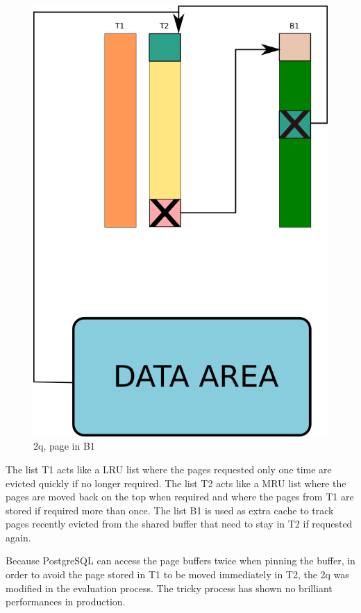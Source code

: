 \begin{figure}[H]
\includegraphics[scale=0.4]{images/2q_04.png}

\caption{2q, page in B1}

\end{figure}

The list T1 acts like a LRU list where the pages requested only one time are evicted quickly if no longer required. 
The list T2 acts like a MRU list where the pages are moved back on the top when required and where the pages from 
T1 are stored if required more than once. The list B1 is used as extra cache to track pages recently evicted from 
the shared buffer that need to stay in T2 if requested again.\newline

Because PostgreSQL can access the page buffers twice when pinning the buffer, in order to avoid the page stored in 
T1 to be moved immediately in T2, the 2q was modified in the evaluation process. The tricky process has shown no 
brilliant performances in production.


